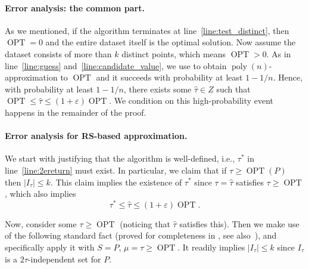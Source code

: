 \documentclass[11pt,letterpaper]{article}
\theoremstyle{plain}
\theoremstyle{definition}
\theoremstyle{remark}
\DeclareMathOperator{\poly}{poly}
\DeclareMathOperator{\OPT}{OPT}
\renewcommand{\epsilon}{\ensuremath{\varepsilon}}
\let\epsilon\varepsilon
\begin{document}
    




    
\paragraph{Error analysis: the common part.}
As we mentioned, if the algorithm terminates at line~\ref{line:test_distinct}, then $\OPT = 0$ and the entire dataset itself is the optimal solution.
Now assume the dataset consists of more than $k$ distinct points, which means $\OPT > 0$. 
As in line~\ref{line:guess} and~\ref{line:candidate_value}, we use  to obtain $\poly(n)$-approximation to $\OPT$
and it succeeds with probability at least $1-1/n$.
Hence, with probability at least $1-1/n$, there exists some $\hat{\tau}\in Z$ such that $\OPT\leq \hat{\tau}\leq (1+\varepsilon)\OPT$. 
We condition on this high-probability event happens in the remainder of the proof.


    
\paragraph{Error analysis for RS-based approximation.} 





We start with justifying that the algorithm is well-defined, i.e., $\tau^*$ in line~\ref{line:2ereturn} must exist.
In particular, we claim that if $\tau \geq \OPT(P)$ then $|I_\tau| \leq k$. 
This claim implies the existence of $\tau^*$ since $\tau = \hat{\tau}$ satisfies $\tau \geq \OPT$,
which also implies
\begin{equation}
    \label{eqn:taustar}
    \tau^* \leq \hat{\tau} \leq (1 + \epsilon) \OPT.
\end{equation}

Now, consider some $\tau\geq \OPT$ (noticing that $\hat{\tau}$ satisfies this). 
Then we make use of the following standard fact (proved for completeness in , see also~\cite{DBLP:journals/jacm/HochbaumS86}),
and specifically apply it with  $S=P$, $\mu = \tau\geq \OPT$.
It readily implies $|I_\tau| \leq k$ since $I_{\tau}$ is a $2\tau$-independent set for $P$.  
    
\end{document}
